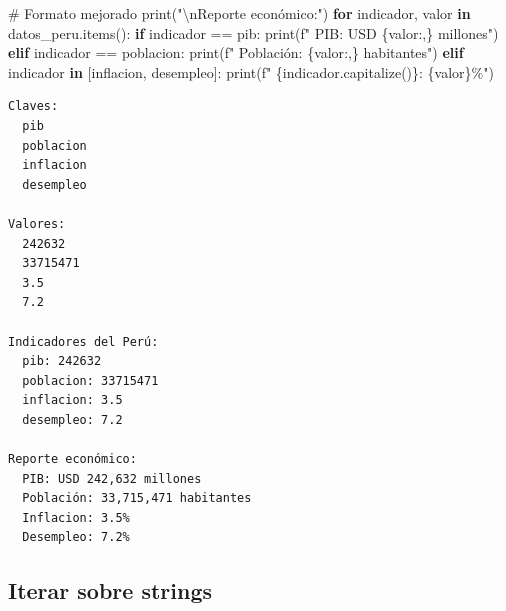 \documentclass[
  doc,
  floatsintext,
  longtable,
  a4paper,
  nolmodern,
  notxfonts,
  notimes,
  12pt,
  colorlinks=true,linkcolor=blue,citecolor=blue,urlcolor=blue]{apa7}
\newenvironment{Shaded}{\begin{snugshade}}{\end{snugshade}}
\newcommand{\BuiltInTok}[1]{\textcolor[rgb]{0.00,0.23,0.31}{#1}}
\newcommand{\CharTok}[1]{\textcolor[rgb]{0.13,0.47,0.30}{#1}}
\newcommand{\CommentTok}[1]{\textcolor[rgb]{0.37,0.37,0.37}{#1}}
\newcommand{\ControlFlowTok}[1]{\textcolor[rgb]{0.00,0.23,0.31}{\textbf{#1}}}
\newcommand{\KeywordTok}[1]{\textcolor[rgb]{0.00,0.23,0.31}{\textbf{#1}}}
\newcommand{\NormalTok}[1]{\textcolor[rgb]{0.00,0.23,0.31}{#1}}
\newcommand{\OperatorTok}[1]{\textcolor[rgb]{0.37,0.37,0.37}{#1}}
\newcommand{\SpecialCharTok}[1]{\textcolor[rgb]{0.37,0.37,0.37}{#1}}
\newcommand{\SpecialStringTok}[1]{\textcolor[rgb]{0.13,0.47,0.30}{#1}}
\newcommand{\StringTok}[1]{\textcolor[rgb]{0.13,0.47,0.30}{#1}}
\begin{document}
\begin{Shaded}
\begin{Highlighting}[]
\CommentTok{\# Formato mejorado}
\BuiltInTok{print}\NormalTok{(}\StringTok{"}\CharTok{\textbackslash{}n}\StringTok{Reporte económico:"}\NormalTok{)}
\ControlFlowTok{for}\NormalTok{ indicador, valor }\KeywordTok{in}\NormalTok{ datos\_peru.items():}
    \ControlFlowTok{if}\NormalTok{ indicador }\OperatorTok{==} \StringTok{\textquotesingle{}pib\textquotesingle{}}\NormalTok{:}
        \BuiltInTok{print}\NormalTok{(}\SpecialStringTok{f"  PIB: USD }\SpecialCharTok{\{}\NormalTok{valor}\SpecialCharTok{:,\}}\SpecialStringTok{ millones"}\NormalTok{)}
    \ControlFlowTok{elif}\NormalTok{ indicador }\OperatorTok{==} \StringTok{\textquotesingle{}poblacion\textquotesingle{}}\NormalTok{:}
        \BuiltInTok{print}\NormalTok{(}\SpecialStringTok{f"  Población: }\SpecialCharTok{\{}\NormalTok{valor}\SpecialCharTok{:,\}}\SpecialStringTok{ habitantes"}\NormalTok{)}
    \ControlFlowTok{elif}\NormalTok{ indicador }\KeywordTok{in}\NormalTok{ [}\StringTok{\textquotesingle{}inflacion\textquotesingle{}}\NormalTok{, }\StringTok{\textquotesingle{}desempleo\textquotesingle{}}\NormalTok{]:}
        \BuiltInTok{print}\NormalTok{(}\SpecialStringTok{f"  }\SpecialCharTok{\{}\NormalTok{indicador}\SpecialCharTok{.}\NormalTok{capitalize()}\SpecialCharTok{\}}\SpecialStringTok{: }\SpecialCharTok{\{}\NormalTok{valor}\SpecialCharTok{\}}\SpecialStringTok{\%"}\NormalTok{)}
\end{Highlighting}
\end{Shaded}

\begin{verbatim}
Claves:
  pib
  poblacion
  inflacion
  desempleo

Valores:
  242632
  33715471
  3.5
  7.2

Indicadores del Perú:
  pib: 242632
  poblacion: 33715471
  inflacion: 3.5
  desempleo: 7.2

Reporte económico:
  PIB: USD 242,632 millones
  Población: 33,715,471 habitantes
  Inflacion: 3.5%
  Desempleo: 7.2%
\end{verbatim}

\subsection{Iterar sobre strings}\label{iterar-sobre-strings}
\end{document}
